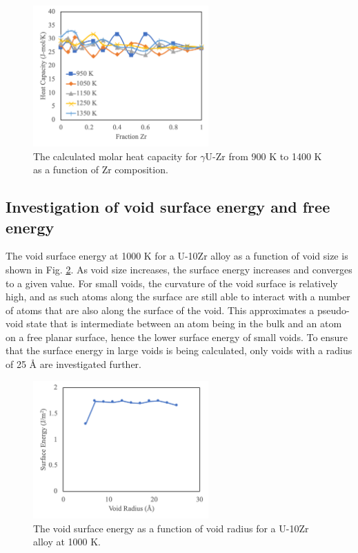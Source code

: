 \documentclass[review]{elsarticle}
\begin{document}
\begin{figure}[!htp]
\begin{center}
\includegraphics[width=0.6\textwidth]{Cp}
\end{center}
\caption{The calculated molar heat capacity for $\gamma$U-Zr from 900 K to 1400 K as a function of Zr composition. }
\label{fig:cp}
\end{figure}

\FloatBarrier

\subsection{Investigation of void surface energy and free energy}\label{sec:res2}

The void surface energy at 1000 K for a U-10Zr alloy as a function of void size is shown in Fig. \ref{fig:size}. As void size increases, the surface energy increases and converges to a given value. For small voids, the curvature of the void surface is relatively high, and as such atoms along the surface are still able to interact with a number of atoms that are also along the surface of the void. This approximates a pseudo-void state that is intermediate between an atom being in the bulk and an atom on a free planar surface, hence the lower surface energy of small voids. To ensure that the surface energy in large voids is being calculated, only voids with a radius of 25 {\AA} are investigated further. 

\begin{figure}[!htp]
\begin{center}
\includegraphics[width=0.6\textwidth]{size}
\end{center}
\caption{The void surface energy as a function of void radius for a U-10Zr alloy at 1000 K. }
\label{fig:size}
\end{figure}
\end{document}
